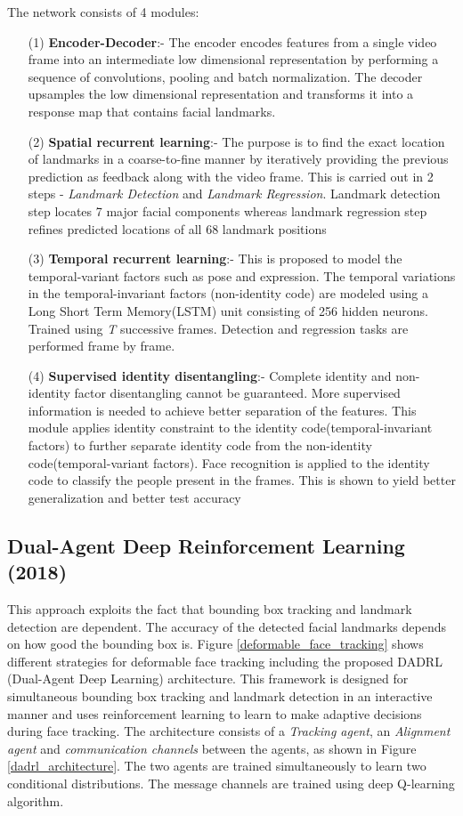 \documentclass{llncs}
\begin{document}
	The network consists of 4 modules:
	\begin{itemize}
		\item[(1)] \textbf{Encoder-Decoder}:-
		The encoder encodes features from a single video frame into an intermediate low dimensional representation by performing a sequence of convolutions, pooling and batch normalization. The decoder upsamples the low dimensional representation and transforms it into a response map that contains facial landmarks.
		\item[(2)] \textbf{Spatial recurrent learning}:-
		The purpose is to find the exact location of landmarks in a coarse-to-fine manner by iteratively providing the previous prediction as feedback along with the video frame. This is carried out in 2 steps - \textit{Landmark Detection} and \textit{Landmark Regression}. Landmark detection step locates 7 major facial components whereas landmark regression step refines predicted locations of all 68 landmark positions
		\item[(3)] \textbf{Temporal recurrent learning}:-
		This is proposed to model the temporal-variant factors such as pose and expression. The temporal variations in the temporal-invariant factors (non-identity code) are modeled using a Long Short Term Memory(LSTM) unit consisting of 256 hidden neurons.
		Trained using \textit{T} successive frames. Detection and regression tasks are performed frame by frame.
		\item[(4)] \textbf{Supervised identity disentangling}:-
		Complete identity and non-identity factor disentangling cannot be guaranteed. More supervised information is needed to achieve better separation of the features. This module applies identity constraint to the identity code(temporal-invariant factors) to further separate identity code from the non-identity code(temporal-variant factors). Face recognition is applied to the identity code to classify the people present in the frames. This is shown to yield better generalization and better test accuracy\\
	\end{itemize}
	



	\subsection{Dual-Agent Deep Reinforcement Learning (2018) \cite{dadrl}}
	This approach exploits the fact that bounding box tracking and landmark detection are dependent. The accuracy of the detected facial landmarks depends on how good the bounding box is.
	Figure \ref{deformable_face_tracking} shows different strategies for deformable face tracking including the proposed DADRL (Dual-Agent Deep Learning) architecture. This framework is designed for simultaneous bounding box tracking and landmark detection in an interactive manner and uses reinforcement learning to learn to make adaptive decisions during face tracking. The architecture consists of a \textit{Tracking agent}, an \textit{Alignment agent} and \textit{communication channels} between the agents, as shown in Figure \ref{dadrl_architecture}. The two agents are trained simultaneously to learn two conditional distributions. The message channels are trained using deep Q-learning algorithm.
	
\end{document}
